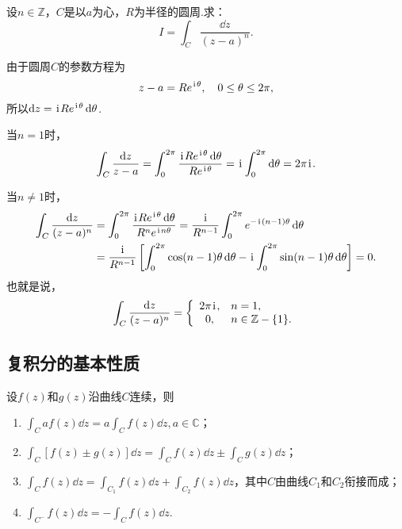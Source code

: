 \begin{example}
设\(n\in\mathbb{Z}\)，\(C\)是以\(a\)为心，\(R\)为半径的圆周.求：\[
I = \int_C \frac{\dd{z}}{(z-a)^n}.
\]
\begin{solution}
由于圆周\(C\)的参数方程为\[
z-a=Re^{\kern1pt\mathrm{i}\kern1pt\theta}, \quad 0 \leq \theta \leq 2\pi,
\]所以\(\dd{z}=\kern1pt\mathrm{i}\kern1pt R e^{\kern1pt\mathrm{i}\kern1pt\theta} \dd{\theta}\).

当\(n=1\)时，\[
\int_C \frac{\dd{z}}{z-a}
= \int_0^{2\pi}{\frac{\kern1pt\mathrm{i}\kern1pt R e^{\kern1pt\mathrm{i}\kern1pt\theta} \dd{\theta}}{R e^{\kern1pt\mathrm{i}\kern1pt\theta}}}
= \kern1pt\mathrm{i}\kern1pt \int_0^{2\pi}\dd{\theta}
= 2\pi\kern1pt\mathrm{i}\kern1pt.
\]

当\(n \neq 1\)时，\begin{align*}
\int_C{\frac{\dd{z}}{(z-a)^n}}
&= \int_0^{2\pi}{
	\frac{
		\kern1pt\mathrm{i}\kern1pt R e^{\kern1pt\mathrm{i}\kern1pt\theta} \dd{\theta}
	}{
		R^n e^{\kern1pt\mathrm{i}\kern1pt n \theta}
	}
}
= \frac{\kern1pt\mathrm{i}\kern1pt}{R^{n-1}} \int_0^{2\pi}{e^{-\kern1pt\mathrm{i}\kern1pt(n-1)\theta}\dd{\theta}} \\
&= \frac{\kern1pt\mathrm{i}\kern1pt}{R^{n-1}} \left[
	\int_0^{2\pi}{\cos(n-1)\theta\dd{\theta}}
	-\kern1pt\mathrm{i}\kern1pt \int_0^{2\pi}{\sin(n-1)\theta\dd{\theta}}
	\right]
= 0.
\end{align*}
也就是说，\begin{equation}\label{equation:解析函数的积分表示.重要积分1}
\int_C \frac{\dd{z}}{(z-a)^n} = \left\{ \begin{array}{cl}
2\pi\kern1pt\mathrm{i}\kern1pt, & n=1, \\
0, & n\in\mathbb{Z}-\{1\}.
\end{array} \right.
\end{equation}
\end{solution}
\end{example}

\subsection{复积分的基本性质}
\begin{property}
设\(f(z)\)和\(g(z)\)沿曲线\(C\)连续，则\begin{enumerate}
\item \(\int_C a f(z) \dd{z} = a \int_C f(z) \dd{z}, a\in\mathbb{C}\)；
\item \(\int_C [f(z) \pm g(z)] \dd{z} = \int_C f(z) \dd{z} \pm \int_C g(z) \dd{z}\)；
\item \(\int_C f(z) \dd{z} = \int_{C_1} f(z) \dd{z} + \int_{C_2} f(z) \dd{z}\)，其中\(C\)由曲线\(C_1\)和\(C_2\)衔接而成；
\item \(\int_{C^-} f(z) \dd{z} = -\int_C f(z) \dd{z}\).
\end{enumerate}
\end{property}

